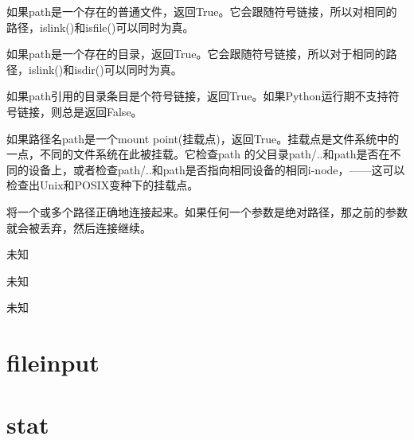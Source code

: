 \noindent{\color{red}{os.path.isfile(path):}}
\par{如果path是一个存在的普通文件，返回True。它会跟随符号链接，所以对相同的路径，islink()和isfile()可以同时为真。}\\

\noindent{\color{red}{os.path.isdir(path):}}
\par{如果path是一个存在的目录，返回True。它会跟随符号链接，所以对于相同的路径，islink()和isdir()可以同时为真。}\\

\noindent{\color{red}{os.path.islink(path):}}
\par{如果path引用的目录条目是个符号链接，返回True。如果Python运行期不支持符号链接，则总是返回False。}\\

\noindent{\color{red}{os.path.ismount(path):}}
\par{如果路径名path是一个mount point(挂载点)，返回True。挂载点是文件系统中的一点，不同的文件系统在此被挂载。它检查path
的父目录path/..和path是否在不同的设备上，或者检查path/..和path是否指向相同设备的相同i-node，——这可以检查出Unix和POSIX变种下的挂载点。}\\

\noindent{\color{red}{os.path.join(path, *paths):}}
\par{将一个或多个路径正确地连接起来。如果任何一个参数是绝对路径，那之前的参数就会被丢弃，然后连接继续。}\\

\noindent{\color{red}{os.path.normcase(path):}}
\par{未知}\\

\noindent{\color{red}{os.path.normpath(path):}}
\par{未知}\\

\noindent{\color{red}{os.path.realpath(path):}}
\par{未知}\\



\section{fileinput}





\section{stat}





